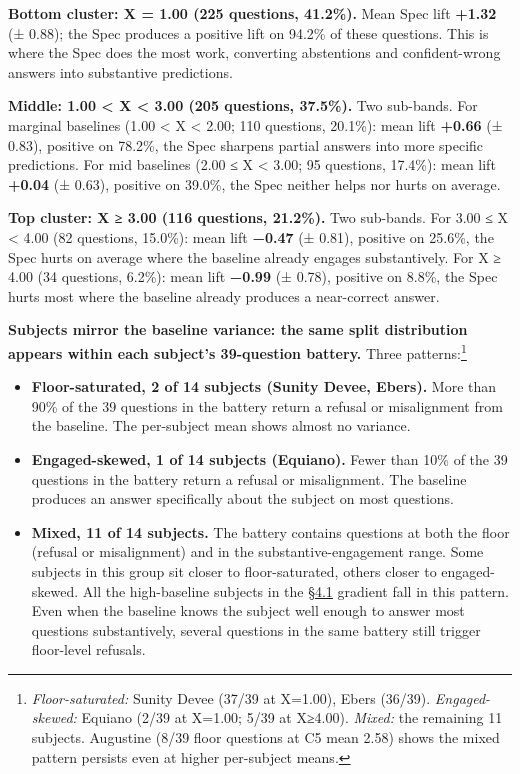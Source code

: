\textbf{Bottom cluster: X = 1.00 (225 questions, 41.2\%).} Mean Spec
lift \textbf{+1.32} (± 0.88); the Spec produces a positive lift on
94.2\% of these questions. This is where the Spec does the most work,
converting abstentions and confident-wrong answers into substantive
predictions.

\textbf{Middle: 1.00 \textless{} X \textless{} 3.00 (205 questions,
37.5\%).} Two sub-bands. For marginal baselines (1.00 \textless{} X
\textless{} 2.00; 110 questions, 20.1\%): mean lift \textbf{+0.66} (±
0.83), positive on 78.2\%, the Spec sharpens partial answers into more
specific predictions. For mid baselines (2.00 ≤ X \textless{} 3.00; 95
questions, 17.4\%): mean lift \textbf{+0.04} (± 0.63), positive on
39.0\%, the Spec neither helps nor hurts on average.

\textbf{Top cluster: X ≥ 3.00 (116 questions, 21.2\%).} Two sub-bands.
For 3.00 ≤ X \textless{} 4.00 (82 questions, 15.0\%): mean lift
\textbf{−0.47} (± 0.81), positive on 25.6\%, the Spec hurts on average
where the baseline already engages substantively. For X ≥ 4.00 (34
questions, 6.2\%): mean lift \textbf{−0.99} (± 0.78), positive on 8.8\%,
the Spec hurts most where the baseline already produces a near-correct
answer.

\textbf{Subjects mirror the baseline variance: the same split
distribution appears within each subject's 39-question battery.} Three
patterns:\footnote{\emph{Floor-saturated:} Sunity Devee (37/39 at
  X=1.00), Ebers (36/39). \emph{Engaged-skewed:} Equiano (2/39 at
  X=1.00; 5/39 at X≥4.00). \emph{Mixed:} the remaining 11 subjects.
  Augustine (8/39 floor questions at C5 mean 2.58) shows the mixed
  pattern persists even at higher per-subject means.}

\begin{itemize}
\tightlist
\item
  \textbf{Floor-saturated, 2 of 14 subjects (Sunity Devee, Ebers).} More
  than 90\% of the 39 questions in the battery return a refusal or
  misalignment from the baseline. The per-subject mean shows almost no
  variance.
\item
  \textbf{Engaged-skewed, 1 of 14 subjects (Equiano).} Fewer than 10\%
  of the 39 questions in the battery return a refusal or misalignment.
  The baseline produces an answer specifically about the subject on most
  questions.
\item
  \textbf{Mixed, 11 of 14 subjects.} The battery contains questions at
  both the floor (refusal or misalignment) and in the
  substantive-engagement range. Some subjects in this group sit closer
  to floor-saturated, others closer to engaged-skewed. All the
  high-baseline subjects in the \hyperref[the-cross-subject-gradient-and-its-per-question-mechanism]{§4.1} gradient fall in this pattern. Even
  when the baseline knows the subject well enough to answer most
  questions substantively, several questions in the same battery still
  trigger floor-level refusals.
\end{itemize}

